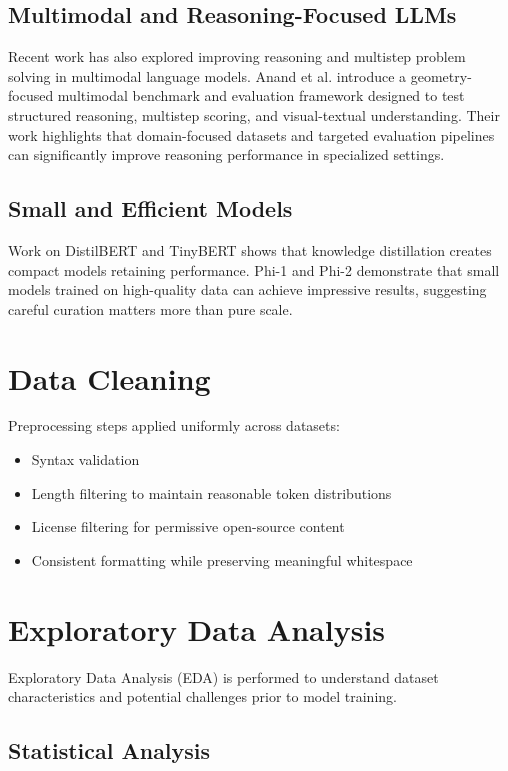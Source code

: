 \documentclass[preprint,12pt]{elsarticle}
\begin{document}
\subsection{Multimodal and Reasoning-Focused LLMs}
Recent work has also explored improving reasoning and multistep problem solving in multimodal language models. Anand et al. \citep{anand2024geometry} introduce a geometry-focused multimodal benchmark and evaluation framework designed to test structured reasoning, multistep scoring, and visual-textual understanding. Their work highlights that domain-focused datasets and targeted evaluation pipelines can significantly improve reasoning performance in specialized settings.

\subsection{Small and Efficient Models}
Work on DistilBERT \citep{sanh2019distilbert} and TinyBERT \citep{jiao2020tinybert} shows that knowledge distillation creates compact models retaining performance. Phi-1 and Phi-2 \citep{gunasekar2023phi} demonstrate that small models trained on high-quality data can achieve impressive results, suggesting careful curation matters more than pure scale.

\section{Data Cleaning}

Preprocessing steps applied uniformly across datasets:
\begin{itemize}
\item Syntax validation
\item Length filtering to maintain reasonable token distributions
\item License filtering for permissive open-source content
\item Consistent formatting while preserving meaningful whitespace
\end{itemize}

\section{Exploratory Data Analysis}

Exploratory Data Analysis (EDA) is performed to understand dataset characteristics and potential challenges prior to model training.

\subsection{Statistical Analysis}
\end{document}
